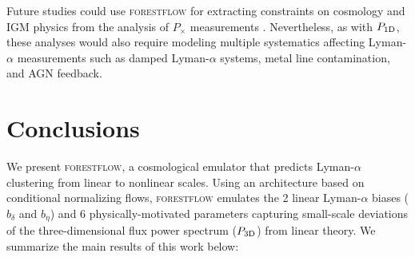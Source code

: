 \documentclass[longauth]{aa}
\newcommand{\lya}{Lyman-$\alpha$\xspace}
\newcommand{\pcross}{$P_{\times}$\xspace}
\newcommand{\poned}{\ensuremath{P_{\rm 1D}}\xspace}
\newcommand{\pthreed}{\ensuremath{P_{\rm 3D}}\xspace}
\newcommand{\forestflow}{\textsc{forestflow}\xspace}
\begin{document}
Future studies could use \forestflow for extracting constraints on cosmology and IGM physics from the analysis of \pcross measurements \citep[e.g.;][]{Karim2023}. Nevertheless, as with \poned, these analyses would also require modeling multiple systematics affecting \lya measurements such as damped \lya systems, metal line contamination, and AGN feedback.



\section{Conclusions}
\label{sec:conclusions}

We present \forestflow, a cosmological emulator that predicts \lya clustering from linear to nonlinear scales. Using an architecture based on conditional normalizing flows, \forestflow emulates the 2 linear \lya biases ($b_\delta$ and $b_\eta$) and 6 physically-motivated parameters capturing small-scale deviations of the three-dimensional flux power spectrum (\pthreed) from linear theory. We summarize the main results of this work below:
\end{document}
